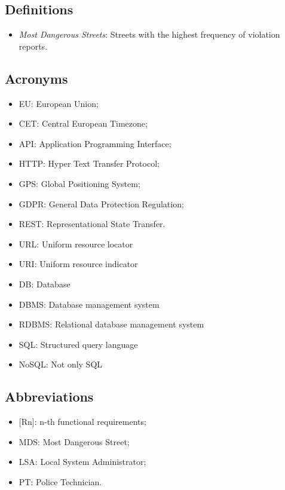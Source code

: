 \subsection{Definitions}
\begin{itemize}
  \item \textit{Most Dangerous Streets}: Streets with the highest frequency of violation reports.
\end{itemize}

\subsection{Acronyms}
\begin{itemize}
  \item EU: European Union;
  \item CET: Central European Timezone;
  \item API: Application Programming Interface;
  \item HTTP: Hyper Text Transfer Protocol;
  \item GPS: Global Positioning System;
  \item GDPR: General Data Protection Regulation;
  \item REST: Representational State Transfer.
  \item URL: Uniform resource locator
  \item URI: Uniform resource indicator
  \item DB: Database
  \item DBMS: Database management system
  \item RDBMS: Relational database management system
  \item SQL: Structured query language
  \item NoSQL: Not only SQL
\end{itemize}

\subsection{Abbreviations}
\begin{itemize}
  \item {[Rn]}: n-th functional requirements;
  \item MDS: Most Dangerous Street;
  \item LSA: Local System Administrator;
  \item PT: Police Technician.
\end{itemize}
